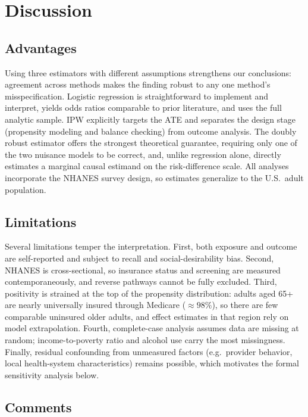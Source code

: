 \documentclass[12pt]{article}
\begin{document}
\section{Discussion} \label{sec:discussion}

\subsection{Advantages} \label{subsec:advantages}

Using three estimators with different assumptions strengthens our conclusions:
agreement across methods makes the finding robust to any one method's
misspecification. Logistic regression is straightforward to implement and
interpret, yields odds ratios comparable to prior literature, and uses the full
analytic sample. IPW explicitly targets the ATE and separates the design stage
(propensity modeling and balance checking) from outcome analysis. The doubly
robust estimator offers the strongest theoretical guarantee, requiring only one
of the two nuisance models to be correct, and, unlike regression alone, directly
estimates a marginal causal estimand on the risk-difference scale. All analyses
incorporate the NHANES survey design, so estimates generalize to the U.S.\ adult
population.

\subsection{Limitations} \label{subsec:limitations}

Several limitations temper the interpretation. First, both exposure and outcome
are self-reported and subject to recall and social-desirability bias. Second,
NHANES is cross-sectional, so insurance status and screening are measured
contemporaneously, and reverse pathways cannot be fully excluded. Third,
positivity is strained at the top of the propensity distribution: adults aged
65+ are nearly universally insured through Medicare ($\approx 98\%$), so there
are few comparable uninsured older adults, and effect estimates in that region
rely on model extrapolation. Fourth, complete-case analysis assumes data are
missing at random; income-to-poverty ratio and alcohol use carry the most
missingness. Finally, residual confounding from unmeasured factors (e.g.\
provider behavior, local health-system characteristics) remains possible, which
motivates the formal sensitivity analysis below.

\subsection{Comments} \label{subsec:finalcomments}
\end{document}
